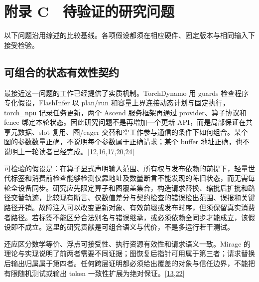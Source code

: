 \documentclass[
  UTF8,
  zihao=5]{ctexart}
\begin{document}
\hypertarget{ux9644ux5f55-c-ux5f85ux9a8cux8bc1ux7684ux7814ux7a76ux95eeux9898}{%
\section*{附录
C　待验证的研究问题}\label{ux9644ux5f55-c-ux5f85ux9a8cux8bc1ux7684ux7814ux7a76ux95eeux9898}}

以下问题沿用综述的比较基线。各项假设都须在相应硬件、固定版本与相同输入下接受检验。

\hypertarget{ux53efux7ec4ux5408ux7684ux72b6ux6001ux6709ux6548ux6027ux5951ux7ea6}{%
\subsection*{可组合的状态有效性契约}\label{ux53efux7ec4ux5408ux7684ux72b6ux6001ux6709ux6548ux6027ux5951ux7ea6}}

最接近这一问题的工作已经提供了实质机制。TorchDynamo 用 guards
检查程序专化假设，FlashInfer 以 plan/run
和容量上界连接动态计划与固定执行，torch\_npu 记录任务更新，两个 Ascend
服务框架再通过 provider、算子协议和 fence
绑定本轮状态。因此研究问题不是再增加一个更新
API，而是局部保证在共享元数据、slot 复用、图/eager
交替和空工作参与通信的条件下如何组合。某个图的参数数量正确，不说明每个参数属于正确请求；某个
buffer
地址正确，也不说明上一轮读者已经完成。{[}\protect\hyperlink{ref-ansel2024pytorch2}{12},\protect\hyperlink{ref-vllmascend2026impl}{16},\protect\hyperlink{ref-sglang2026impl}{17},\protect\hyperlink{ref-ye2025flashinfer}{20},\protect\hyperlink{ref-torchnpu2026graphs}{24}{]}

可检验的假设是：在算子显式声明输入范围、所有权与发布依赖的前提下，轻量世代标签和消费前检查能够检测仅靠地址及数量断言不能发现的陈旧状态，而无需每轮全设备同步。研究应先限定算子和图覆盖集合，构造请求替换、缩批后扩批和路径交替轨迹，比较现有断言、仅数值差分与契约检查的错误检出范围、误报和关键路径开销。故障注入可以改变更新对象、有效前缀或发布时序，但须保留真实消费者路径。若标签不能区分合法别名与错误继承，或必须依赖全同步才能成立，该假设即不成立。这里的研究贡献是可组合语义与代价，不是多运行若干测试。

还应区分数学等价、浮点可接受性、执行资源有效性和请求语义一致。Mirage
的理论与实现说明了前两者需要不同证据；图恢复后指针可用属于第三者；请求替换后输出归属属于第四者。任何跨层证明都必须给出覆盖的对象与信任边界，不能把有限随机测试或输出
token
一致性扩展为绝对保证。{[}\protect\hyperlink{ref-wu2025mirage}{13},\protect\hyperlink{ref-liu2026foundry}{22}{]}
\end{document}
